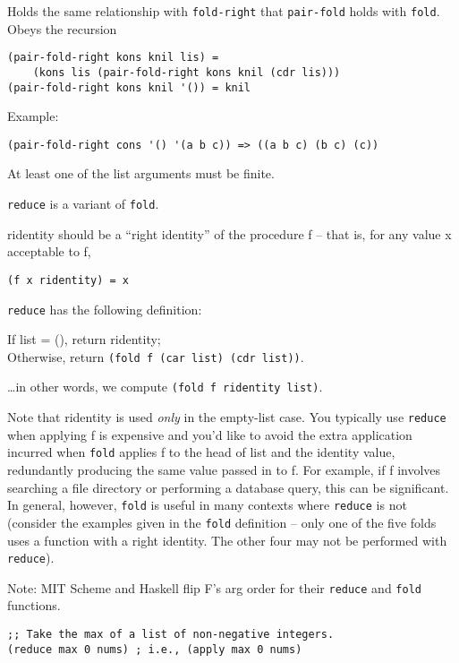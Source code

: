 \begin{entry}{%
  }

  Holds the
  same relationship with \texttt{fold-right} that \texttt{pair-fold}
  holds with \texttt{fold}. Obeys the recursion

\begin{verbatim}
(pair-fold-right kons knil lis) = 
    (kons lis (pair-fold-right kons knil (cdr lis)))
(pair-fold-right kons knil '()) = knil
\end{verbatim}

  Example:

\begin{verbatim}
(pair-fold-right cons '() '(a b c)) => ((a b c) (b c) (c))
\end{verbatim}

  At least one of the list arguments must be finite.
\end{entry}

\begin{entry}{%
  }

  \texttt{reduce} is a variant of \texttt{fold}.

  ridentity should be a ``right identity'' of the procedure f -- that
  is, for any value x acceptable to f,

\begin{verbatim}
(f x ridentity) = x
\end{verbatim}

  \texttt{reduce} has the following definition:

  If list = (), return ridentity;\\
  Otherwise, return \texttt{(fold\ f\ (car\ list)\ (cdr\ list))}.

  \ldots{}in other words, we compute \texttt{(fold\ f\ ridentity\
    list)}.

  Note that ridentity is used \emph{only} in the empty-list case. You
  typically use \texttt{reduce} when applying f is expensive and you'd
  like to avoid the extra application incurred when \texttt{fold}
  applies f to the head of list and the identity value, redundantly
  producing the same value passed in to f. For example, if f involves
  searching a file directory or performing a database query, this can
  be significant. In general, however, \texttt{fold} is useful in many
  contexts where \texttt{reduce} is not (consider the examples given
  in the \texttt{fold} definition -- only one of the five folds uses a
  function with a right identity. The other four may not be performed
  with \texttt{reduce}).

  Note: MIT Scheme and Haskell flip F's arg order for their
  \texttt{reduce} and \texttt{fold} functions.

\begin{verbatim}
;; Take the max of a list of non-negative integers.
(reduce max 0 nums) ; i.e., (apply max 0 nums)
\end{verbatim}
\end{entry}


